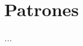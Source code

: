 
\chapter{Patrones}\label{cap:territoriosinteligentes}

\vspace{50px}
\begin{flushright}
    \textit{... }
\end{flushright}

